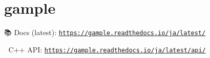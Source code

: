 \chapter{gample }
\hypertarget{md__r_e_a_d_m_e}{}\label{md__r_e_a_d_m_e}
\label{md__r_e_a_d_m_e_autotoc_md0}%
%



\begin{DoxyItemize}
\item 📚 Docs (latest)\+: \href{https://gample.readthedocs.io/ja/latest/}{\texttt{https\+://gample.\+readthedocs.\+io/ja/latest/}}
\item 🔧 C++ API\+: \href{https://gample.readthedocs.io/ja/latest/api/}{\texttt{https\+://gample.\+readthedocs.\+io/ja/latest/api/}} 
\end{DoxyItemize}